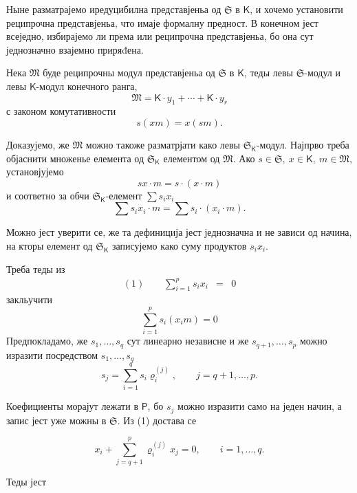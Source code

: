 \documentclass[11pt]{article}
\begin{document}
Ныне разматрајемо иредуцибилна представјеньа од \(\mathfrak S\) в \(\mathsf K\), и хочемо установити реципрочна представјеньа, что имаје формалну предност. В конечном јест всеједно, избирајемо ли према или реципрочна представјеньа, бо она сут једнозначно взајемно приряđена.

Нека \(\mathfrak M\) буде реципрочны модул представјеньа од \(\mathfrak S\) в \(\mathsf K\), теды левы \(\mathfrak S\)-модул и левы \(\mathsf K\)-модул конечного ранга,
\[
\mathfrak M=\mathsf K\cdot y_1+\cdots+\mathsf K\cdot y_r
\]
с законом комутативности
\[
s(xm)=x(sm).
\]

Доказујемо, же \(\mathfrak M\) можно такоже разматрјати како левы \(\mathfrak S_{\mathsf K}\)-модул. Најпрво треба објаснити множенье елемента од \(\mathfrak S_{\mathsf K}\) елементом од \(\mathfrak M\). Ако \(s\in\mathfrak S,\ x\in\mathsf K,\ m\in\mathfrak M\), установјујемо
\[
sx\cdot m=s\cdot(x\cdot m)
\]
и соответно за обчи \(\mathfrak S_{\mathsf K}\)-елемент \(\sum s_ix_i\)
\[
\sum s_ix_i\cdot m=\sum s_i\cdot(x_i\cdot m).
\]

Можно јест уверити се, же та дефиниција јест једнозначна и не зависи од начина, на кторы елемент од \(\mathfrak S_{\mathsf K}\) записујемо како суму продуктов \(s_ix_i\).

Треба теды из
\[
\begin{array}{rcl}
(1)\qquad \displaystyle\sum_{i=1}^{p}s_ix_i&=&0
\end{array}
\]
закльучити
\[
\sum_{i=1}^{p}s_i(x_i m)=0
\]
Предпокладамо, же \(s_1,\ldots,s_q\) сут линеарно независне и же \(s_{q+1},\ldots,s_p\) можно изразити посредством \(s_1,\ldots,s_q\)
\[
s_j=\sum_{i=1}^{q}s_i\varrho_i^{(j)},\qquad j=q+1,\ldots,p.
\]

Коефициенты морајут лежати в \(\mathsf P\), бо \(s_j\) можно изразити само на једен начин, а запис јест уже можны в \(\mathfrak S\). Из (1) достава се

\[
x_i+\sum_{j=q+1}^{p}\varrho_i^{(j)}x_j=0,\qquad i=1,\ldots,q.
\]

Теды јест
\end{document}

